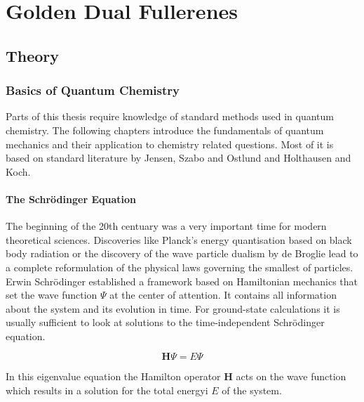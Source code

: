 
\part{Golden Dual Fullerenes}
\label{sec:goldendualfullerenes}


\chapter{Theory}
\label{sec:theorygold}

\section{Basics of Quantum Chemistry}
\label{sec:basicsofQC}

Parts of this thesis require knowledge of standard methods used in quantum
chemistry. The following chapters introduce the fundamentals of quantum
mechanics and their application to chemistry related questions. Most of it is
based on standard literature by Jensen\autocite{jensen_introduction_2006},
Szabo and Ostlund\autocite{szabo_modern_1996} and Holthausen and
Koch\autocite{koch_chemists_2001}.

\subsection{The Schr\"odinger Equation}
\label{sec:schrodingerequation}

The beginning of the 20th centuary was a very important time for modern
theoretical sciences. Discoveries like Planck's energy quantisation based on
black body radiation or the discovery of the wave particle dualism by de
Broglie lead to a complete reformulation of the physical laws governing the
smallest of particles. Erwin Schr\"odinger established a framework based on
Hamiltonian mechanics that set the wave function $\Psi$ at the center of
attention. It contains all information about the system and its evolution in
time. For ground-state calculations it is usually sufficient to look at
solutions to the time-independent Schr\"odinger equation.

\begin{equation}
	\mathbf{H}\Psi=E\Psi\label{eqn:SchrodingerEquation}
\end{equation}

In this eigenvalue equation the Hamilton operator $\mathbf{H}$ acts on the wave
function which results in a solution for the total energyi $E$ of the system. 

